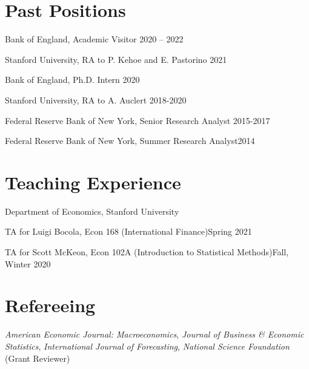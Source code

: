 \documentclass[margin,line]{res}                          %
\newenvironment{list1}{
	\begin{list}{\ding{113}}{%
			\setlength{\itemsep}{0in}
			\setlength{\parsep}{0in} \setlength{\parskip}{0in}
			\setlength{\topsep}{0in} \setlength{\partopsep}{0in}
			\setlength{\leftmargin}{0.17in}}}{\end{list}}
\begin{document}
\begin{resume}
	
	\section{\sc Past Positions}
	\begin{list1}
		\item[] Bank of England, Academic Visitor  \hfill 2020 -- 2022
		\smallskip
		\item[] Stanford University, RA to P. Kehoe and E. Pastorino  \hfill 2021
		\smallskip
		\item[] Bank of England, Ph.D. Intern \hfill 2020
		\smallskip
		\item[] {Stanford University}, RA to A. Auclert  \hfill 2018-2020 \smallskip
		\item[] {Federal Reserve Bank of New York}, Senior Research Analyst  \hfill 2015-2017 \smallskip
		\item[] {Federal Reserve Bank of New York}, Summer Research Analyst\hfill 2014
	\end{list1}
	
	
	\section{\sc Teaching Experience}
	\begin{list1}
		\item[] {Department of Economics, Stanford University} \smallskip
		\item[] TA for Luigi Bocola, Econ 168 (International Finance)\hfill Spring 2021\smallskip
		\item[] TA for Scott McKeon, Econ 102A (Introduction to Statistical Methods)\hfill Fall, Winter 2020\smallskip
	\end{list1}
	
	\section{\sc Refereeing}
	\begin{list1}
		\item[] \emph{American Economic Journal: Macroeconomics}, \emph{Journal of Business \& Economic Statistics}, \emph{International Journal of Forecasting}, \emph{National Science Foundation} (Grant Reviewer) \smallskip
	\end{list1}
	

\end{resume}
\end{document}
